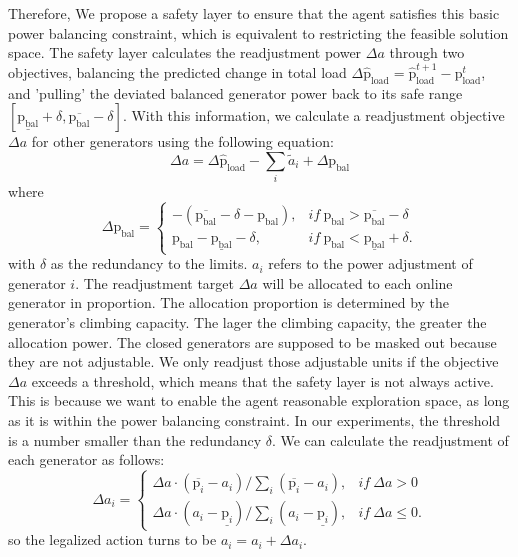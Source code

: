 Therefore, We propose a safety layer to ensure that the agent satisfies this basic power balancing constraint, which is equivalent to restricting the feasible solution space. 
The safety layer calculates the readjustment power $\Delta a$ through two objectives, balancing the predicted change in total load $\Delta\hat{\text{p}}_{\text{load}}=\hat{\text{p}}^{t+1}_\text{load}-\text{p}^t_\text{load}$, and 'pulling' the deviated balanced generator power back to its safe range $[\underline{\text{p}_{\text{bal}}}+\delta, \overline{\text{p}_{\text{bal}}}-\delta]$.
With this information, we calculate a readjustment objective $\Delta a$ for other generators using the following equation:
\begin{equation}
\label{eq:safety_obj}
    \Delta a=\Delta\hat{\text{p}}_{\text{load}}-\sum_i \tilde{a}_i+\Delta \text{p}_{\text{bal}}
\end{equation}
where 
\begin{equation}
    \label{eq:safety_pbal}
    \Delta \text{p}_{\text{bal}}=
    \left\{
             \begin{array}{lr}
             -(\overline{\text{p}_{\text{bal}}}-\delta-\text{p}_{\text{bal}}), & if\ \text{p}_{\text{bal}}>\overline{\text{p}_{\text{bal}}}-\delta \\
             \text{p}_{\text{bal}}-\underline{\text{p}_{\text{bal}}}-\delta, & if\ \text{p}_{\text{bal}}<\underline{\text{p}_{\text{bal}}}+\delta. 
             \end{array}
\right.
\end{equation}
with $\delta$ as the redundancy to the limits. $a_i$ refers to the power adjustment of generator $i$. 
The readjustment target $\Delta a$ will be allocated to each online generator in proportion. The allocation proportion is determined by the generator's climbing capacity. The lager the climbing capacity, the greater the allocation power.
The closed generators are supposed to be masked out because they are not adjustable. We only readjust those adjustable units if the objective $\Delta a$ exceeds a threshold, which means that the safety layer is not always active. This is because we want to enable the agent reasonable exploration space, as long as it is within the power balancing constraint.  In our experiments, the threshold is a number smaller than the redundancy $\delta$. 
We can calculate the readjustment of each generator as follows:
\begin{equation}
\label{eq:safety_readj_value}
    \Delta a_{i}=
    \left\{
             \begin{array}{lr}
             \Delta a\cdot(\overline{\text{p}_i}-a_i)/\sum_i(\overline{\text{p}_i}-a_i), & if\ \Delta a>0 \\
             \Delta a\cdot(a_i-\underline{\text{p}_i})/\sum_i(a_i-\underline{\text{p}_i}), & if\ \Delta a\leq 0. 
             \end{array}
\right.
\end{equation}
so the legalized action turns to be $a_i=a_i+\Delta a_i$. 

